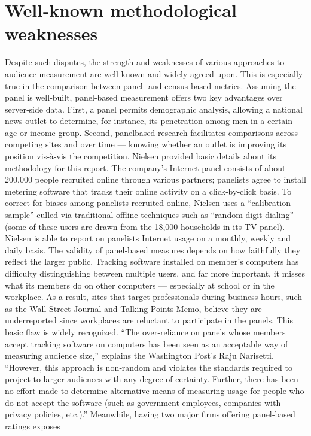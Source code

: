 \section{Well‐known methodological weaknesses}
Despite such disputes, the strength and weaknesses of various approaches
to audience measurement are well known and widely agreed upon. This is
especially true in the comparison between panel‐ and census‐based
metrics.
Assuming the panel is well‐built, panel‐based measurement offers two
key advantages over server‐side data. First, a panel permits demographic
analysis, allowing a national news outlet to determine, for instance, its
penetration among men in a certain age or income group. Second, panelbased
research facilitates comparisons across competing sites and over
time — knowing whether an outlet is improving its position vis‐à‐vis the
competition.
Nielsen provided basic details about its methodology for this report. The
company’s Internet panel consists of about 200,000 people recruited online
through various partners; panelists agree to install metering software that
tracks their online activity on a click‐by‐click basis. To correct for biases
among panelists recruited online, Nielsen uses a ``calibration sample''
culled via traditional offline techniques such as ``random digit dialing''
(some of these users are drawn from the 18,000 households in its TV
panel). Nielsen is able to report on panelists Internet usage on a monthly,
weekly and daily basis.
The validity of panel‐based measures depends on how faithfully they
reflect the larger public. Tracking software installed on member’s
computers has difficulty distinguishing between multiple users, and far
more important, it misses what its members do on other computers —
especially at school or in the workplace. As a result, sites that target
professionals during business hours, such as the Wall Street Journal and
Talking Points Memo, believe they are underreported since workplaces are
reluctant to participate in the panels.
This basic flaw is widely recognized. ``The over‐reliance on panels whose
members accept tracking software on computers has been seen as an
acceptable way of measuring audience size,'' explains the Washington
Post’s Raju Narisetti. ``However, this approach is non‐random and violates
the standards required to project to larger audiences with any degree of
certainty. Further, there has been no effort made to determine alternative
means of measuring usage for people who do not accept the software
(such as government employees, companies with privacy policies, etc.).''
Meanwhile, having two major firms offering panel‐based ratings exposes
